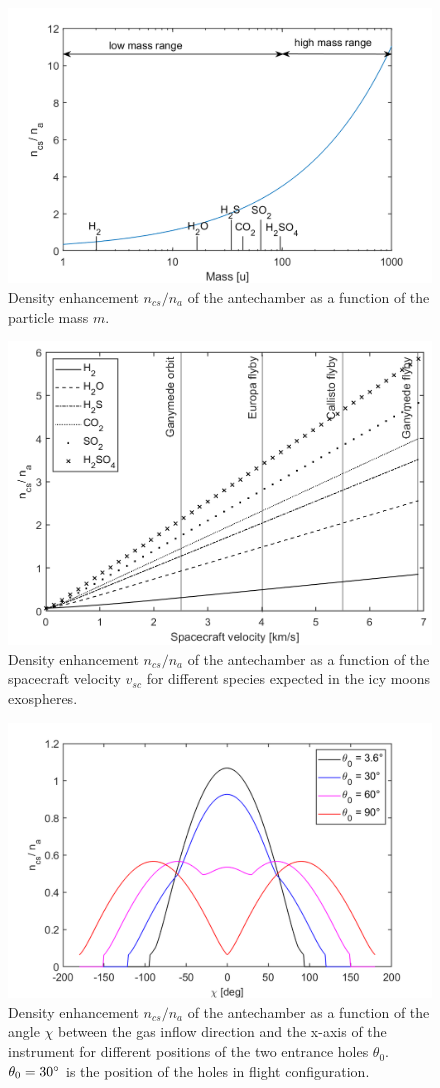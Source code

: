 	\begin{figure}[h!] %
		\centering
		\includegraphics[width= .7\textwidth]{Bilder/mV1.png}
		\caption{Density enhancement $n_{cs}/n_a$ of the antechamber as a function of the particle mass $m$.}
		\label{th:densEnhm}
	\end{figure}
	\begin{figure}[h!] %
		\centering
		\includegraphics[width= .7\textwidth]{Bilder/velocityV1.png}
		\caption{Density enhancement $n_{cs}/n_a$ of the antechamber as a function of the spacecraft velocity $v_{sc}$ for different species expected in the icy moons exospheres.}
		\label{th:densEnhvelo}
	\end{figure}
	\begin{figure}[h!] %
		\centering
		\includegraphics[width= .8\textwidth]{Bilder/Chi_theta0.png}
		\caption{Density enhancement $n_{cs}/n_a$ of the antechamber as a function of the angle $\chi$ between the gas inflow direction and the x-axis of the instrument for different positions of the two entrance holes $\theta_0$. $\theta_0=30^\circ$ is the position of the holes in flight configuration.}
		\label{th:densEnhChiTheta}
	\end{figure}
